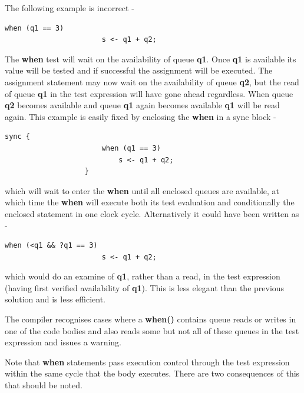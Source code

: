            The following example is incorrect -
            \begin{lstlisting}[gobble=12, language=threepl]
                   when (q1 == 3)
                       s <- q1 + q2;
            \end{lstlisting}
            The {\bf when} test will wait on the availability of queue {\bf q1}.
            Once {\bf q1} is available its value will be tested and if
            successful the assignment will be executed. The assignment statement
            may now wait on the availability of queue {\bf q2}, but the read of
            queue {\bf q1} in the test expression will have gone ahead
            regardless. When queue {\bf q2} becomes available and queue {\bf q1}
            again becomes available {\bf q1} will be read again. This example is
            easily fixed by enclosing the {\bf when} in a sync block -
            \begin{lstlisting}[gobble=12, language=threepl]
                   sync {
                       when (q1 == 3)
                           s <- q1 + q2;
                   }
            \end{lstlisting}
            which will wait to enter the {\bf when} until all enclosed queues
            are available, at which time the {\bf when} will execute both its
            test evaluation and conditionally the enclosed statement in one
            clock cycle. Alternatively it could have been written as -
            \begin{lstlisting}[gobble=12, language=threepl]
                   when (<q1 && ?q1 == 3)
                       s <- q1 + q2;
            \end{lstlisting}
            which would do an examine of {\bf q1}, rather than a read, in the
            test expression (having first verified availability of {\bf q1}).
            This is less elegant than the previous solution and is less
            efficient.
            
            The compiler recognises cases where a {\bf when()} contains
            queue reads or writes in one of the code bodies and also reads
            some but not all of these queues in the test expression and
            issues a warning.

            Note that {\bf when} statements pass execution control
            through the test expression within the same cycle that the body
            executes. There are two consequences of this that should be noted.
            
